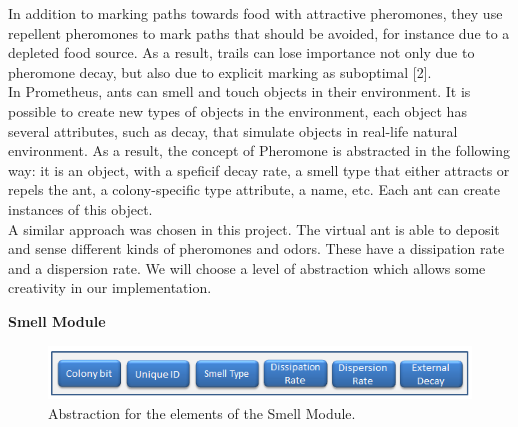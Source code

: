 \documentclass[titlepage, 12pt]{article}
\begin{document}
In addition to marking paths towards food with attractive pheromones, they use repellent pheromones to mark paths that should be avoided, for instance due to a depleted food source. As a result, trails can lose importance not only due to pheromone decay, but also due to explicit marking as suboptimal [2]. \\

In Prometheus, ants can smell and touch objects in their environment. It is possible to create new types of objects in the environment, each object has several attributes, such as decay, that simulate objects in real-life natural environment. As a result, the concept of Pheromone is abstracted in the following way: it is an object, with a speficif decay rate, a smell type that either attracts or repels the ant, a colony-specific type attribute, a name, etc. 
Each ant can create instances of this object. \\

A similar approach was chosen in this project. The virtual ant is able to deposit and sense different kinds of pheromones and odors. These have a dissipation rate and a dispersion rate. We will choose a level of abstraction which allows some creativity in our implementation.\\


\begin{center}
{\bf Smell Module}
\end{center}
 \vspace{-5 mm}
\begin{figure}[h!]
    \centering
    \includegraphics{smell.png}
    \caption{Abstraction for the elements of the Smell Module.}
\end{figure}
 
\end{document}
